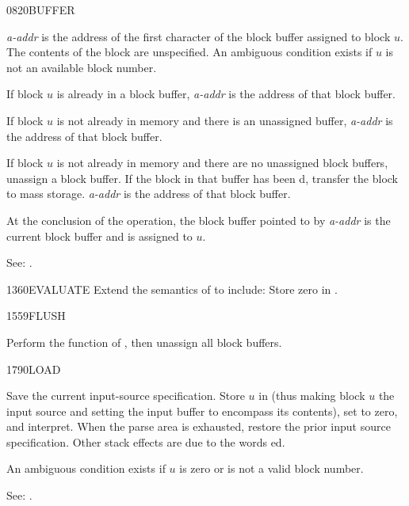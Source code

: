 \begin{newword}{0820}{BUFFER}

	\emph{a-addr} is the address of the first character of the
	block buffer assigned to block $u$. The contents of the block
	are unspecified. An ambiguous condition exists if $u$ is not
	an available block number.

	If block $u$ is already in a block buffer, \emph{a-addr} is
	the address of that block buffer.

	If block $u$ is not already in memory and there is an unassigned
	buffer, \emph{a-addr} is the address of that block buffer.

	If block $u$ is not already in memory and there are no
	unassigned block buffers, unassign a block buffer. If the block
	in that buffer has been d, transfer the block to
	mass storage. \emph{a-addr} is the address of that block buffer.

	At the conclusion of the operation, the block buffer pointed to
	by \emph{a-addr} is the current block buffer and is assigned to
	$u$.

\item[See:]
	.
\end{newword}


\begin{newword}{1360}{EVALUATE}
	Extend the semantics of  to
	include: Store zero in .
\end{newword}


\begin{newword}{1559}{FLUSH}
	\stack{}{}

	Perform the function of , then unassign all
	block buffers.
\end{newword}


\begin{newword}{1790}{LOAD}

	Save the current input-source specification. Store $u$ in
	 (thus making block $u$ the input source and setting
	the input buffer to encompass its contents), set
	 to zero, and interpret. When the parse area is
	exhausted, restore the prior input source specification. Other
	stack effects are due to the words ed.

	An ambiguous condition exists if $u$ is zero or is not a valid
	block number.

\item[See:]
	.
\end{newword}


